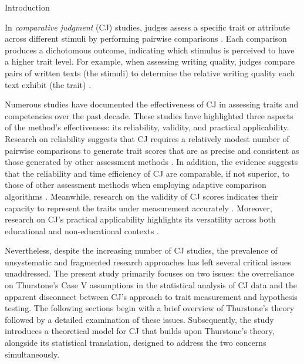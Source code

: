 \documentclass[
  authoryear,
  review,
  1p]{elsarticle}
\begin{document}
Introduction

In \emph{comparative judgment} (CJ) studies, judges assess a specific
trait or attribute across different stimuli by performing pairwise
comparisons \citep{Thurstone_1927a, Thurstone_1927b}. Each comparison
produces a dichotomous outcome, indicating which stimulus is perceived
to have a higher trait level. For example, when assessing writing
quality, judges compare pairs of written texts (the stimuli) to
determine the relative writing quality each text exhibit (the trait)
\citep{Laming_2004, Pollitt_2012b, Whitehouse_2012, vanDaal_et_al_2016, Lesterhuis_2018_thesis, Coertjens_et_al_2017, Goossens_et_al_2018, Bouwer_et_al_2023}.

Numerous studies have documented the effectiveness of CJ in assessing
traits and competencies over the past decade. These studies have
highlighted three aspects of the method's effectiveness: its
reliability, validity, and practical applicability. Research on
reliability suggests that CJ requires a relatively modest number of
pairwise comparisons \citep{Verhavert_et_al_2019, Crompvoets_et_al_2022}
to generate trait scores that are as precise and consistent as those
generated by other assessment methods
\citep{Coertjens_et_al_2017, Goossens_et_al_2018, Bouwer_et_al_2023}. In
addition, the evidence suggests that the reliability and time efficiency
of CJ are comparable, if not superior, to those of other assessment
methods when employing adaptive comparison algorithms
\citep{Pollitt_2012b, Verhavert_et_al_2022, Mikhailiuk_et_al_2021}.
Meanwhile, research on the validity of CJ scores indicates their
capacity to represent the traits under measurement accurately
\citep{Whitehouse_2012, vanDaal_et_al_2016, Lesterhuis_2018_thesis, Bartholomew_et_al_2018, Bouwer_et_al_2023}.
Moreover, research on CJ's practical applicability highlights its
versatility across both educational and non-educational contexts
\citep{Kimbell_2012, Jones_et_al_2015, Bartholomew_et_al_2018, Jones_et_al_2019, Marshall_et_al_2020, Bartholomew_et_al_2020, Boonen_et_al_2020}.

Nevertheless, despite the increasing number of CJ studies, the
prevalence of unsystematic and fragmented research approaches has left
several critical issues unaddressed. The present study primarily focuses
on two issues: the overreliance on Thurstone's Case V assumptions in the
statistical analysis of CJ data and the apparent disconnect between CJ's
approach to trait measurement and hypothesis testing. The following
sections begin with a brief overview of Thurstone's theory followed by a
detailed examination of these issues. Subsequently, the study introduces
a theoretical model for CJ that builds upon Thurstone's theory,
alongside its statistical translation, designed to address the two
concerns simultaneously.
\end{document}
